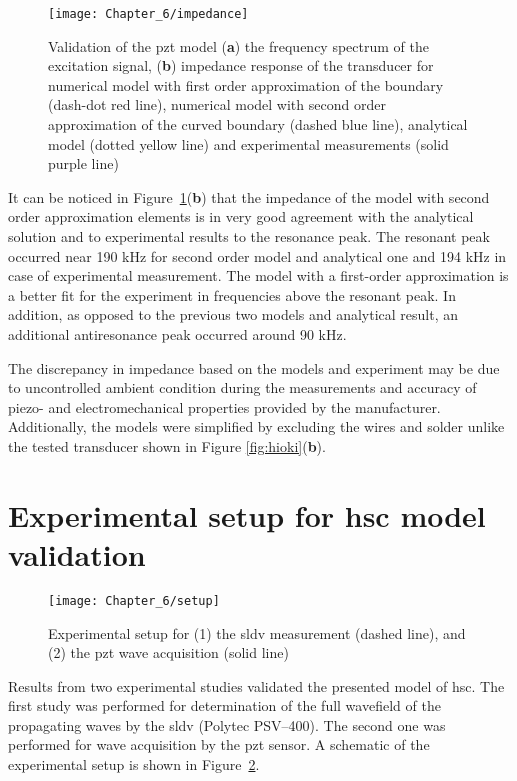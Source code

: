 \documentclass[11pt,a4paper,final]{report}
\theoremstyle{plain}
\begin{document}
\begin{figure}[H]
	\begin{center}
		\texttt{[image: Chapter\_6/impedance]}
	\end{center}
	\caption{Validation of the \acl{pzt} model (\textbf{a}) the frequency spectrum of the excitation signal, (\textbf{b}) impedance response of the transducer for numerical model with first order approximation of the boundary (dash-dot red line), numerical model with second order approximation of the curved boundary (dashed blue line), analytical model (dotted yellow line) and experimental measurements (solid purple line)}
	\label{fig:impedance}
\end{figure}

It can be noticed in Figure~\ref{fig:impedance}(\textbf{b}) that the impedance of the model with second order approximation elements is in very good agreement with the analytical solution and to experimental results to the resonance peak.
The resonant peak occurred near 190 \unit{\kHz} for second order model and analytical one and 194 \unit{\kHz} in case of experimental measurement.
The model with a first-order approximation is a better fit for the experiment in frequencies above the resonant peak.
In addition, as opposed to the previous two models and analytical result, an additional antiresonance peak occurred around 90 \unit{\kHz}.

The discrepancy in impedance based on the models and experiment may be due to uncontrolled ambient condition during the measurements and accuracy of piezo- and electromechanical properties provided by the manufacturer. 
Additionally, the models were simplified by excluding the wires and solder unlike the tested transducer shown in Figure \ref{fig:hioki}(\textbf{b}). \section{Experimental setup for \acl{hsc} model validation}
\label{sec:setup}
\begin{figure}[!htb]
	\begin{center}
		\texttt{[image: Chapter\_6/setup]}
	\end{center}
	\caption{Experimental setup for (1) the \acf{sldv} measurement (dashed line), and (2) the \acf{pzt} wave acquisition (solid line)}
	\label{fig:setup}
\end{figure}
Results from two experimental studies validated the presented model of \ac{hsc}.
The first study was performed for determination of the full wavefield of the propagating waves by the \ac{sldv} (Polytec PSV–400).
The second one was performed for wave acquisition by the \ac{pzt} sensor.
A schematic of the experimental setup is shown in Figure~\ref{fig:setup}.
\end{document}
